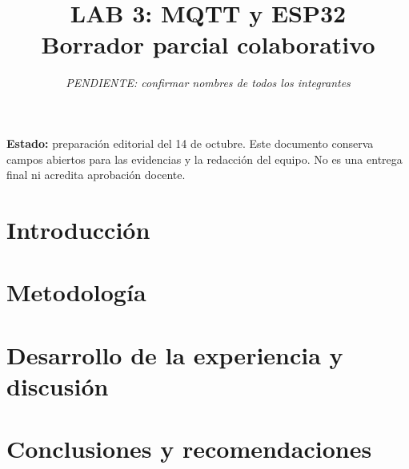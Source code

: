 \documentclass[journal]{IEEEtran}
\begin{document}
\title{LAB 3: MQTT y ESP32\\Borrador parcial colaborativo}
\author{\textit{PENDIENTE: confirmar nombres de todos los integrantes}}
\maketitle
\noindent\textbf{Estado:} preparación editorial del 14 de octubre.
Este documento conserva campos abiertos para las evidencias y la redacción
del equipo. No es una entrega final ni acredita aprobación docente.

\section{Introducción}

\section{Metodología}

\section{Desarrollo de la experiencia y discusión}

\section{Conclusiones y recomendaciones}



\end{document}
